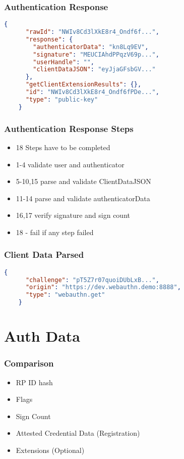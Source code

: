 \documentclass{beamer}
\begin{document}
\begin{frame}[fragile]
  \frametitle{Authentication Response}
  \begin{lstlisting}[language=json]
    {
      "rawId": "NWIv8Cd3lXkE8r4_Ondf6f...",
      "response": {
        "authenticatorData": "kn8Lq9EV",
        "signature": "MEUCIAhdPPqzV69p...",
        "userHandle": "",
        "clientDataJSON": "eyJjaGFsbGV..."
      },
      "getClientExtensionResults": {},
      "id": "NWIv8Cd3lXkE8r4_Ondf6fPDe...",
      "type": "public-key"
    }
  \end{lstlisting}
\end{frame}

\begin{frame}[fragile]
  \frametitle{Authentication Response Steps}
  \begin{itemize}
    \item 18 Steps have to be completed
    \item 1-4 validate user and authenticator
    \item 5-10,15 parse and validate ClientDataJSON
    \item 11-14 parse and validate authenticatorData
    \item 16,17 verify signature and sign count
    \item 18 - fail if any step failed
  \end{itemize}
\end{frame}

\begin{frame}[fragile]
  \frametitle{Client Data Parsed}
  \begin{lstlisting}[language=json]
    {
      "challenge": "pT5Z7r07quoiDUbLxB...",
      "origin": "https://dev.webauthn.demo:8888",
      "type": "webauthn.get"
    }
  \end{lstlisting}
\end{frame}

\section{Auth Data}

\begin{frame}[fragile]
  \frametitle{Comparison}
  \begin{itemize}
    \item RP ID hash
    \item Flags
    \item Sign Count
    \item Attested Credential Data (Registration)
    \item Extensions (Optional)
  \end{itemize}
\end{frame}
\end{document}
